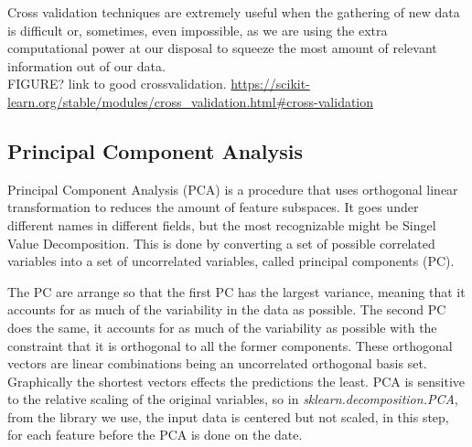 	Cross validation techniques are extremely useful when the gathering of new data is difficult or, sometimes, even impossible, as we are using the extra computational power at our disposal to squeeze the most amount of relevant information out of our data.\\

FIGURE?
link to good crossvalidation.
\url{https://scikit-learn.org/stable/modules/cross_validation.html#cross-validation}


\subsection{Principal Component Analysis }\label{sec:PCA}
	Principal Component Analysis (\ac{PCA}) \cite{james2013introduction} is a procedure that uses orthogonal linear transformation to reduces the amount of feature subspaces. It goes under different names in different fields, but the most recognizable might be Singel Value Decomposition. This is done by converting a set of possible correlated variables into a set of uncorrelated variables, called principal components (PC). 
	
	The PC are arrange so that the first PC has the largest variance, meaning that it accounts for as much of the variability in the data as possible. The second PC does the same, it accounts for as much of the variability as possible with the constraint that it is orthogonal to all the former components. These orthogonal vectors are linear combinations being an uncorrelated orthogonal basis set. Graphically the shortest vectors effects the predictions the least. PCA is sensitive to the relative scaling of the original variables, so in \textit{sklearn.decomposition.PCA}, from the library we use, the input data is centered but not scaled, in this step, for each feature before the PCA is done on the date.
	


